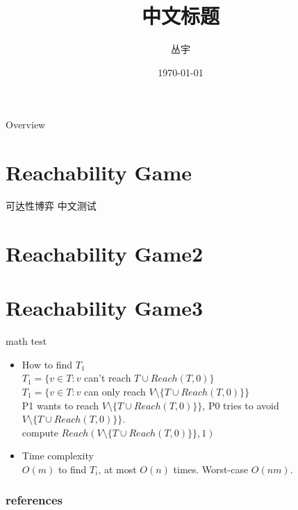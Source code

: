 \documentclass[aspectratio=169]{beamer}
\author{丛宇}
\title{中文标题}
\date{\today}
\begin{document}
   \begingroup

      \makeatletter
      \setlength{\hoffset}{.5\beamer@sidebarwidth}
      \makeatother


      \begin{frame}[plain]
         \titlepage
      \end{frame}

      \begin{frame}[plain]{Overview}
         \tableofcontents
      \end{frame}
   \endgroup
\section{Reachability Game}
\begin{frame}{可达性博弈}
   中文测试
\end{frame}
\section{Reachability Game2}
\section{Reachability Game3}

\begin{frame}{math test}
   \begin{itemize}
      \item How to find $T_1$\\

      $T_1=\{v\in T : v$ can't reach $T\cup Reach(T,0)\}$\\
      $T_1=\{v\in T: v$ can only reach $V\setminus \{T\cup Reach(T,0)\}\}$\\
      P1 wants to reach $V\setminus \{T\cup Reach(T,0)\}\}$, P0 tries to avoid $V\setminus \{T\cup Reach(T,0)\}\}$.\\
      compute $Reach(V\setminus \{T\cup Reach(T,0)\}\},1)$

      \item Time complexity\\
          $O(m)$ to find $T_i$, at most $O(n)$ times. Worst-case $O(nm)$.
  \end{itemize}

\end{frame}
\begin{frame}
   \frametitle{references}



\end{frame}
\end{document}
